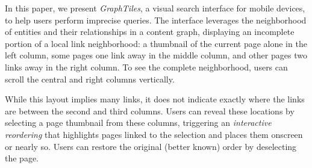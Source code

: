 In this paper, we present \textit{GraphTiles}, a visual search interface for mobile devices, to help users perform imprecise queries. The interface leverages the neighborhood of entities and their relationships in a content graph, displaying an incomplete portion of a local link neighborhood: a thumbnail of the current page alone in the left column, some pages one link away in the middle column, and other pages two links away in the right column. To see the complete neighborhood, users can scroll the central and right columns vertically.

While this layout implies many links, it does not indicate exactly where the links are between the second and third columns. Users can reveal these locations by selecting a page thumbnail from these columns, triggering an \textit{interactive reordering} that highlights pages linked to the selection and places them onscreen or nearly so. Users can restore the original (better known) order by deselecting the page.


